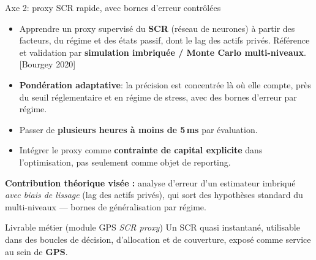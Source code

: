 \documentclass[aspectratio=169,11pt]{beamer}
\newcommand{\highlight}[1]{\textcolor{GeneraliRed}{\textbf{#1}}}
\newcommand{\source}[1]{{\scriptsize\textcolor{Slate!65}{[#1]}}}
\begin{document}
\begin{frame}[shrink=15]{Axe 2: proxy SCR rapide, avec bornes d'erreur contrôlées}
  \begin{itemize}
    \item Apprendre un proxy supervisé du \highlight{SCR} (réseau de neurones) à partir des facteurs, du régime et des états passif, dont le lag des actifs privés. Référence et validation par \highlight{simulation imbriquée / Monte Carlo multi-niveaux}. \source{Bourgey 2020}
    \item \highlight{Pondération adaptative}: la précision est concentrée là où elle compte, près du seuil réglementaire et en régime de stress, avec des bornes d'erreur par régime.
    \item Passer de \highlight{plusieurs heures à moins de 5\,ms} par évaluation.
    \item Intégrer le proxy comme \highlight{contrainte de capital explicite} dans l'optimisation, pas seulement comme objet de reporting.
  \end{itemize}

  {\footnotesize \highlight{Contribution théorique visée :} analyse d'erreur d'un estimateur imbriqué \emph{avec biais de lissage} (lag des actifs privés), qui sort des hypothèses standard du multi-niveaux — bornes de généralisation par régime.}

  \begin{block}{Livrable métier (module GPS \textemdash{} \textit{SCR proxy})}
    Un SCR quasi instantané, utilisable dans des boucles de décision, d'allocation et de couverture, exposé comme service au sein de \highlight{GPS}.
  \end{block}
\end{frame}
\end{document}
